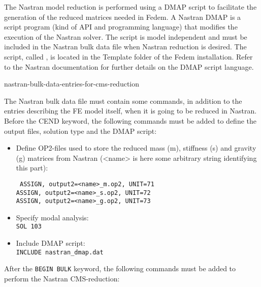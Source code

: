 The Nastran model reduction is performed using a DMAP script to facilitate the
generation of the reduced matrices needed in Fedem.
A Nastran DMAP is a script program (kind of API and programming language)
that modifies the execution of the Nastran solver. The script is model
independent and must be included in the Nastran bulk data file when Nastran
reduction is desired. The script, called ,
is located in the Template folder of the Fedem installation. Refer to
the Nastran documentation for further details on the DMAP script language.


           {nastran-bulk-data-entries-for-cms-reduction}

The Nastran bulk data file must contain some commands, in addition to
the entries describing the FE model itself, when it is going to be
reduced in Nastran. Before the CEND keyword, the following commands must
be added to define the output files, solution type and the DMAP script:

\begin{itemize}
\item
  Define OP2-files used to store the reduced mass (m), stiffness (s) and
  gravity (g) matrices from Nastran (\textless name\textgreater{} is
  here some arbitrary string identifying this part):

  \texttt{%
    ASSIGN, output2=\textquotesingle\textless name\textgreater\_m.op2\textquotesingle, UNIT=71 \\
    ASSIGN, output2=\textquotesingle\textless name\textgreater\_s.op2\textquotesingle, UNIT=72 \\
    ASSIGN, output2=\textquotesingle\textless name\textgreater\_g.op2\textquotesingle, UNIT=73}
\end{itemize}


\begin{itemize}
\item Specify modal analysis: \\
  \texttt{SOL 103}
\item Include DMAP script: \\
  \texttt{INCLUDE \textquotesingle nastran\_dmap.dat\textquotesingle}
\end{itemize}

After the \texttt{BEGIN BULK} keyword, the following commands must be added
to perform the Nastran CMS-reduction:

